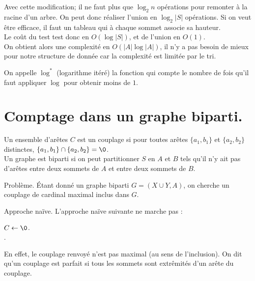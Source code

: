 \documentclass[french, 11pt]{article}
\begin{document}
\begin{defi}{}{}
    Avec cette modification; il ne faut plus que $\log_2n$ opérations pour remonter à la racine d'un arbre. On peut donc réaliser l'union en $\log_2|S|$ opérations. Si on veut être efficace, il faut un tableau qui à chaque sommet associe sa hauteur.\\
    Le coût du test test donc en $O(\log|S|)$, et de l'union en $O(1)$.\\
    On obtient alors une complexité en $O(|A|\log|A|)$, il n'y a pas besoin de mieux pour notre structure de donnée car la complexité est limitée par le tri.
\end{defi}

\begin{defi}{}{}
    On appelle $\log^*$ (logarithme itéré) la fonction qui compte le nombre de fois qu'il faut appliquer $\log$ pour obtenir moins de $1$. 
\end{defi}

\section{Comptage dans un graphe biparti.}

\begin{defi}{}{}
    Un ensemble d'arêtes $C$ est un couplage si pour toutes arêtes $\{a_1,b_1\}$ et $\{a_2,b_2\}$ distinctes, $\{a_1,b_1\}\cap\{a_2,b_2\}=\0$.\\
    Un graphe est biparti si on peut partitionner $S$ en $A$ et $B$ tels qu'il n'y ait pas d'arêtes entre deux sommets de $A$ et entre deux sommets de $B$.
\end{defi}

\begin{defi}{Problème.}{}
    Étant donné un graphe biparti $G=(X\cup Y, A)$, on cherche un couplage de cardinal maximal inclus dans $G$.
\end{defi}

\begin{defi}{Approche naïve.}{}
    L'approche naïve suivante ne marche pas :\\
    \begin{algorithm}[H]
        $C\gets\0$.\\
        .
    \end{algorithm}
    En effet, le couplage renvoyé n'est pas maximal (au sens de l'inclusion). On dit qu'un couplage est parfait si tous les sommets sont extrêmités d'un arête du couplage.
\end{defi}
\end{document}

